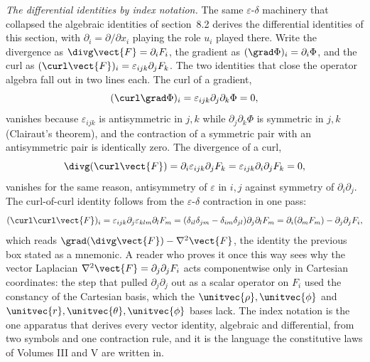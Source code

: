 \begin{mastery}
\textit{The differential identities by index notation.} The same
$\varepsilon$-$\delta$ machinery that collapsed the algebraic
identities of section~8.2 derives the differential identities of this
section, with $\partial_{i} = \partial/\partial x_{i}$ playing the
role $u_{i}$ played there. Write the divergence as $\divg\vect{F} =
\partial_{i}F_{i}$, the gradient as $(\grad\Phi)_{i} =
\partial_{i}\Phi$, and the curl as $(\curl\vect{F})_{i} =
\varepsilon_{ijk}\partial_{j}F_{k}$. The two identities that close the
operator algebra fall out in two lines each. The curl of a gradient,
\[
(\curl\grad\Phi)_{i} = \varepsilon_{ijk}\partial_{j}\partial_{k}\Phi
= 0,
\]
vanishes because $\varepsilon_{ijk}$ is antisymmetric in $j, k$ while
$\partial_{j}\partial_{k}\Phi$ is symmetric in $j, k$ (Clairaut's
theorem), and the contraction of a symmetric pair with an
antisymmetric pair is identically zero. The divergence of a curl,
\[
\divg(\curl\vect{F}) = \partial_{i}\varepsilon_{ijk}\partial_{j}F_{k}
= \varepsilon_{ijk}\partial_{i}\partial_{j}F_{k} = 0,
\]
vanishes for the same reason, antisymmetry of $\varepsilon$ in $i, j$
against symmetry of $\partial_{i}\partial_{j}$. The curl-of-curl
identity follows from the $\varepsilon$-$\delta$ contraction in one
pass:
\[
(\curl\curl\vect{F})_{i} = \varepsilon_{ijk}\partial_{j}
\varepsilon_{klm}\partial_{l}F_{m} = (\delta_{il}\delta_{jm} -
\delta_{im}\delta_{jl})\partial_{j}\partial_{l}F_{m} =
\partial_{i}(\partial_{m}F_{m}) - \partial_{j}\partial_{j}F_{i},
\]
which reads $\grad(\divg\vect{F}) - \nabla^{2}\vect{F}$, the identity
the previous box stated as a mnemonic. A reader who proves it once
this way sees why the vector Laplacian $\nabla^{2}\vect{F} =
\partial_{j}\partial_{j}F_{i}$ acts componentwise only in Cartesian
coordinates: the step that pulled $\partial_{j}\partial_{j}$ out as a
scalar operator on $F_{i}$ used the constancy of the Cartesian basis,
which the $\unitvec{\rho}, \unitvec{\phi}$ and $\unitvec{r},
\unitvec{\theta}, \unitvec{\phi}$ bases lack. The index notation is
the one apparatus that derives every vector identity, algebraic and
differential, from two symbols and one contraction rule, and it is the
language the constitutive laws of Volumes III and V are written in.
\end{mastery}

